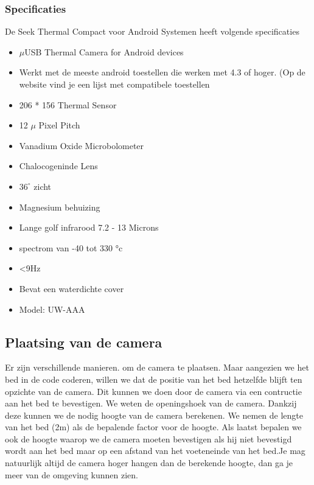 \subsubsection{Specificaties}
\label{mRefSTS}
De Seek Thermal Compact voor Android Systemen heeft volgende specificaties
\begin{itemize}
	\item $\mu$USB Thermal Camera for Android devices
	\item Werkt met de meeste android toestellen die werken met 4.3 of hoger. (Op de website vind je een lijst met compatibele toestellen \cite{bibImgSTC}
	\item 206 * 156 Thermal Sensor
	\item 12 $\mu$ Pixel Pitch
	\item Vanadium Oxide Microbolometer
	\item Chalocogeninde Lens
	\item $36^{\circ}$ zicht
	\item Magnesium behuizing
	\item Lange golf infrarood 7.2 - 13 Microns
	\item  spectrom van -40 tot 330 °c
	\item <9Hz
	\item Bevat een waterdichte cover
	\item Model: UW-AAA
\end{itemize}
\cite{bibImgSTC}

\subsection {Plaatsing van de camera}
\label{mRefSTP}
Er zijn verschillende manieren. om de camera te plaatsen. Maar aangezien we het bed in de code coderen, willen we dat de positie van het bed hetzelfde blijft ten opzichte van de camera. Dit kunnen we doen door de camera via een contructie aan het bed te bevestigen. We weten de openingshoek van de camera. Dankzij deze kunnen we de nodig hoogte van de camera berekenen. We nemen de lengte van het bed (2m) als de bepalende factor voor de hoogte. Als laatst bepalen we ook de hoogte waarop we de camera moeten bevestigen als hij niet bevestigd wordt aan het bed maar op een afstand van het voeteneinde van het bed.Je mag natuurlijk altijd de camera hoger hangen dan de berekende hoogte, dan ga je meer van de omgeving kunnen zien. 

